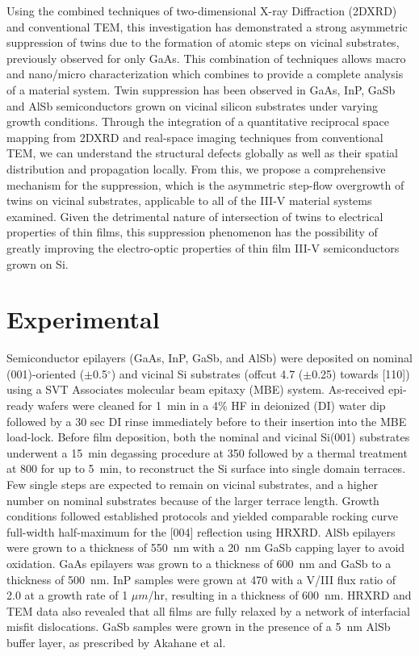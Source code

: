 Using the combined techniques of two-dimensional X-ray Diffraction (2DXRD) and conventional TEM, this investigation has demonstrated a strong asymmetric suppression of twins due to the formation of atomic steps on vicinal substrates, previously observed for only GaAs\cite{Wei1994,Xie1990,Rajkumar1990}.
This combination of techniques allows macro and nano/micro characterization which combines to provide a complete analysis of a material system.
Twin suppression has been observed in GaAs, InP, GaSb and AlSb semiconductors grown on vicinal silicon substrates under varying growth conditions.
Through the integration of a quantitative reciprocal space mapping from 2DXRD and real-space imaging techniques from conventional TEM, we can understand the structural defects globally as well as their spatial distribution and propagation locally.
From this, we propose a comprehensive mechanism for the suppression, which is the asymmetric step-flow overgrowth of twins on vicinal substrates, applicable to all of the III-V material systems examined.
Given the detrimental nature of intersection of twins to electrical properties of thin films, this suppression phenomenon has the possibility of greatly improving the electro-optic properties of thin film III-V semiconductors grown on Si.
\section{Experimental}
Semiconductor epilayers (GaAs, InP, GaSb, and AlSb) were deposited on nominal (001)-oriented (\(\pm\)0.5\(^\circ\)) and vicinal Si substrates (offcut 4.7\degree{} (\(\pm\)0.25\degree) towards [110]) using a SVT Associates molecular beam epitaxy (MBE) system.
As-received epi-ready wafers were cleaned for 1~min in a 4\% HF in deionized (DI) water dip followed by a 30 sec DI rinse immediately before to their insertion into the MBE load-lock.
Before film deposition, both the nominal and vicinal Si(001) substrates underwent a 15~min degassing procedure at 350\celsius{} followed by a thermal treatment at 800\celsius{} for up to 5~min, to reconstruct the Si surface into single domain terraces\cite{NeergaardWaltenburg1995,S1991,Sakamoto1986,Pehlke1991}.
Few single steps are expected to remain on vicinal substrates, and a higher number on nominal substrates because of the larger terrace length.
Growth conditions followed established protocols\cite{Akahane2004,Balakrishnan2006a,Fischer1986} and yielded comparable rocking curve full-width half-maximum for the [004] reflection using HRXRD\@.
AlSb epilayers were grown to a thickness of 550~nm with a 20~nm GaSb capping layer to avoid oxidation.
GaAs epilayers was grown to a thickness of 600~nm and GaSb to a thickness of 500~nm.
InP samples were grown at 470\celsius{} with a V/III flux ratio of 2.0 at a growth rate of 1 \(\mu m\)/hr, resulting in a thickness of 600~nm.
HRXRD and TEM data also revealed that all films are fully relaxed by a network of interfacial misfit dislocations\cite{Vajargah2011}.
GaSb samples were grown in the presence of a 5~nm AlSb buffer layer, as prescribed by Akahane et al.\cite{Akahane2004}

